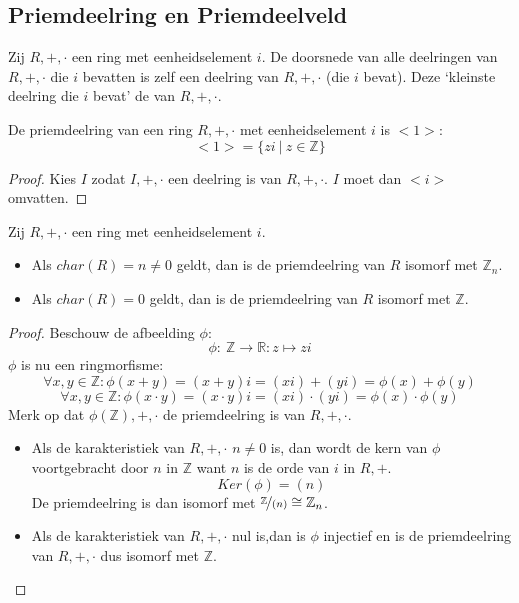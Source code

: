 \documentclass[main.tex]{subfiles}
\begin{document}
\subsection{Priemdeelring en Priemdeelveld}
\label{sec:priemd-en-priemd}

\begin{de}
  Zij $R,+,\cdot$ een ring met eenheidselement $i$.
  De doorsnede van alle deelringen van $R,+,\cdot$ die $i$ bevatten is zelf een deelring van $R,+,\cdot$ (die $i$ bevat).
  Deze `kleinste deelring die $i$ bevat' de  van $R,+,\cdot$.
\end{de}

\begin{ei}
  \label{ei:priemdeelring-voortgebracht-door-eenheidselement}
  De priemdeelring van een ring $R,+,\cdot$ met eenheidselement $i$ is $<1>$:
  \[ <1> = \{ zi \ |\ z \in \mathbb{Z} \} \]

  \begin{proof}
    Kies $I$ zodat $I,+,\cdot$ een deelring is van $R,+,\cdot$.
    $I$ moet dan $<i>$ omvatten.
  \end{proof}
\end{ei}

\begin{st}
  \label{st:karakteristiek-isomorfisme-met-zn}
  Zij $R,+,\cdot$ een ring met eenheidselement $i$.
  \begin{itemize}
  \item Als $char(R) = n \neq 0$ geldt, dan is de priemdeelring van $R$ isomorf met $\mathbb{Z}_{n}$.
  \item Als $char(R) = 0$ geldt, dan is de priemdeelring van $R$ isomorf met $\mathbb{Z}$.
  \end{itemize}

  \begin{proof}
    Beschouw de afbeelding $\phi$:
    \[ \phi:\ \mathbb{Z} \rightarrow \mathbb{R}: z \mapsto zi \]
    $\phi$ is nu een ringmorfisme:
    \[ \forall x,y\in \mathbb{Z}: \phi(x+y) = (x+y) i = (xi) + (yi) = \phi(x) + \phi(y) \]
    \[ \forall x,y\in \mathbb{Z}: \phi(x\cdot y) = (x\cdot y)i = (xi) \cdot (yi) = \phi(x) \cdot \phi(y) \]
    Merk op dat $\phi(\mathbb{Z}),+,\cdot$ de priemdeelring is van $R,+,\cdot$.
    \begin{itemize}
    \item Als de karakteristiek van $R,+,\cdot$ $n\neq 0$ is, dan wordt de kern van $\phi$ voortgebracht door $n$ in $\mathbb{Z}$ want $n$ is de orde van $i$ in $R,+$.
      \[ Ker(\phi) = (n) \]
      De priemdeelring is dan isomorf met $\nicefrac{\mathbb{Z}}{(n)} \cong \mathbb{Z}_{n}$.\needed
    \item Als de karakteristiek van $R,+,\cdot$ nul is,dan is $\phi$ injectief \waarom en is de priemdeelring van $R,+,\cdot$ dus isomorf met $\mathbb{Z}$.
    \end{itemize}
  \end{proof}
\end{st}
\end{document}
